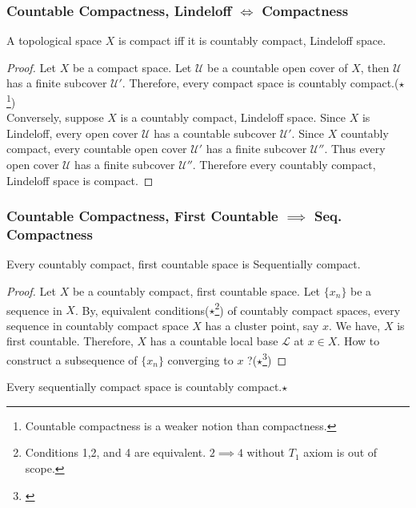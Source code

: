 \subsubsection{Countable Compactness, Lindeloff $\iff$ Compactness}
\begin{theorem}
	A topological space $X$ is compact iff it is countably compact, Lindeloff space.
\end{theorem}
\begin{proof}
	Let $X$ be a compact space.
	Let $\mathcal{U}$ be a  countable open cover of $X$, then $\mathcal{U}$ has a finite subcover $\mathcal{U}'$.
	Therefore, every compact space is countably compact.($\star$\footnote{Countable compactness is a weaker notion than compactness.})\\

	Conversely, suppose $X$ is a countably compact, Lindeloff space.
	Since $X$ is Lindeloff, every open cover $\mathcal{U}$ has a countable subcover $\mathcal{U}'$.
	Since $X$ countably compact, every countable open cover $\mathcal{U}'$ has a finite subcover $\mathcal{U}''$.
	Thus every open cover $\mathcal{U}$ has a finite subcover $\mathcal{U}''$.
	Therefore every countably compact, Lindeloff space is compact.
\end{proof}

\subsubsection{Countable Compactness, First Countable $\implies$ Seq. Compactness}
\begin{theorem}
	Every countably compact, first countable space is Sequentially compact.
\end{theorem}
\begin{proof}
	Let $X$ be a countably compact, first countable space.
	Let $\{x_n\}$ be a sequence in $X$.
	By, equivalent conditions($\star$\footnote{\cite[11.1]{joshi} Conditions 1,2, and 4 are equivalent.
	$2 \implies 4$ without $T_1$ axiom is out of scope.}) of countably compact spaces, every sequence in countably compact space $X$ has a cluster point, say $x$.
	We have, $X$ is first countable.
	Therefore, $X$ has a countable local base $\mathcal{L}$ at $x \in X$.
	How to construct a subsequence of $\{x_n\}$ converging to $x$ ?($\star$\footnote{\cite[Exercises 10.1.11]{joshi}})
\end{proof}

\begin{remark}
	Every sequentially compact space is countably compact.$\star$
\end{remark}

